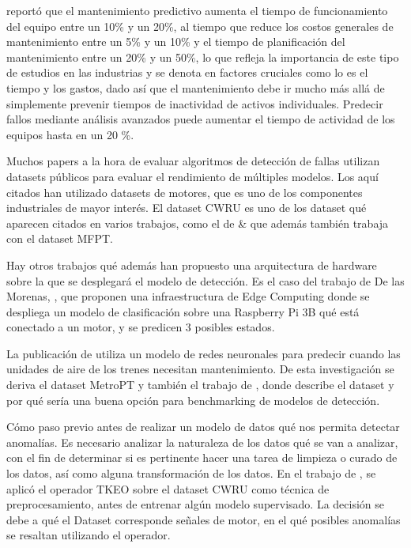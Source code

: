 \documentclass[11pt,a4paper,spanish]{book}
\numberwithin{equation}{chapter}
\numberwithin{figure}{chapter}
\begin{document}
\cite{deloitte2022predictive} reportó que el mantenimiento predictivo aumenta el 
tiempo de funcionamiento del equipo entre un 10\% y un 20\%, al tiempo que reduce los 
costos generales de mantenimiento entre un 5\% y un 10\% y el tiempo de planificación 
del mantenimiento entre un 20\% y un 50\%, lo que refleja la importancia de este tipo 
de estudios en las industrias y se denota en factores cruciales como lo es el tiempo y 
los gastos, dado así que el mantenimiento debe ir mucho más allá de simplemente 
prevenir tiempos de inactividad de activos individuales. Predecir fallos mediante 
análisis avanzados puede aumentar el tiempo de actividad de los equipos hasta en un 
20 \%.


Muchos papers a la hora de evaluar algoritmos de detección de fallas utilizan datasets 
públicos para evaluar el rendimiento de múltiples modelos. Los aquí citados han 
utilizado datasets de motores, que es uno de los componentes industriales de mayor 
interés. El dataset CWRU es uno de los dataset qué aparecen citados en varios trabajos, 
como el de \cite{yu2025tkeo} \& \cite{raj2024bearing} que además también trabaja con el 
dataset MFPT.


Hay otros trabajos qué además han propuesto una arquitectura de hardware sobre la que se 
desplegará el modelo de detección. Es el caso del trabajo de De las Morenas, 
\cite{delasmorenas2025bearing}, que proponen una infraestructura de Edge Computing 
donde se despliega un modelo de clasificación sobre una Raspberry Pi 3B qué está 
conectado a un motor, y se predicen 3 posibles estados.


La publicación de \cite{davari2021} utiliza un modelo de redes neuronales para predecir 
cuando las unidades de aire de los trenes necesitan mantenimiento. De esta investigación 
se deriva el dataset MetroPT y también el trabajo de  \cite{veloso2022metrpt}, donde 
describe el dataset y por qué sería una buena opción para benchmarking de modelos de 
detección.


Cómo paso previo antes de realizar un modelo de datos qué nos permita detectar anomalías.
Es necesario analizar la naturaleza de los datos qué se van a analizar, con el fin de 
determinar si es pertinente hacer una tarea de limpieza o curado de los datos, así como 
alguna transformación de los datos. En el trabajo de \cite{yu2025tkeo}, se aplicó el 
operador TKEO sobre el dataset CWRU como técnica de preprocesamiento, antes de entrenar 
algún modelo supervisado. La decisión se debe a qué el Dataset corresponde  señales de 
motor, en el qué posibles anomalías se resaltan utilizando el operador.
\end{document}
